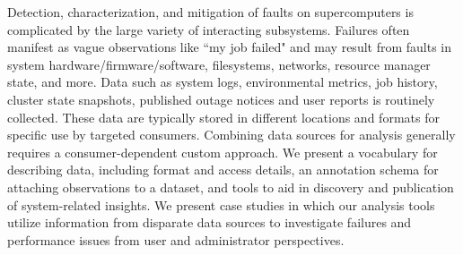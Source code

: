 Detection, characterization, and mitigation of faults on supercomputers is
complicated by the large variety of interacting subsystems. Failures often
manifest as vague observations like ``my job failed" and may result from
faults in system
hardware/firmware/software, filesystems, networks, resource manager state, and
more.  Data such as system logs, environmental metrics, job history, cluster
state snapshots, published outage notices and user reports is routinely
collected. These data are typically stored in different locations and formats
for specific use by targeted consumers. Combining data sources for analysis
generally requires a consumer-dependent custom approach.  We present a
vocabulary for describing data, including format and access details, an
annotation schema for attaching observations to a dataset, and tools to aid in
discovery and publication of system-related insights. We present case studies in
which our analysis tools utilize information from disparate data sources to
investigate failures and performance issues from user and administrator perspectives.

